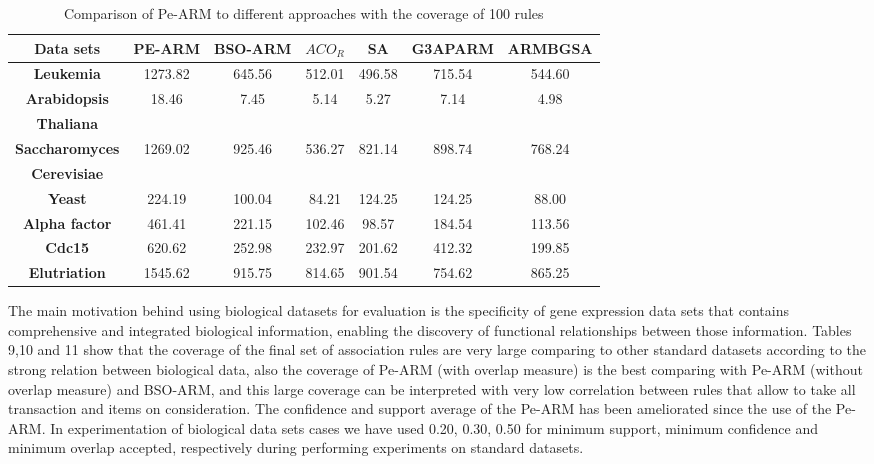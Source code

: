 \documentclass[preprint,12pt]{elsarticle}
\begin{document}
\begin{table}
\small
\centering
\caption{Comparison of Pe-ARM to  different approaches with the coverage of 100 rules}
\begin{tabular}{c c c c c c c}
\toprule
\textbf{Data sets} & PE-ARM& BSO-ARM & $ACO_{R}$ & SA & G3APARM & ARMBGSA \\
\midrule
\textbf{Leukemia}                 &  1273.82  & 645.56 & 512.01 & 496.58 & 715.54 & 544.60 \\\hline
\textbf{Arabidopsis }     &  \multirow{2}{*}{18.46 }     & \multirow{2}{*}{7.45} & \multirow{2}{*}{5.14  } & \multirow{2}{*}{5.27} & \multirow{2}{*}{7.14 }  & \multirow{2}{*}{4.98}  \\
\textbf{Thaliana} &   & &	 &  &  & \\\hline
\textbf{Saccharomyces } &  \multirow{2}{*}{1269.02}  & \multirow{2}{*}{925.46} & \multirow{2}{*}{536.27} & \multirow{2}{*}{821.14} & \multirow{2}{*}{898.74} & \multirow{2}{*}{768.24}  \\
\textbf{Cerevisiae} &   & &	 &  &  & \\\hline

\textbf{Yeast}                    &  224.19    & 100.04& 84.21  & 124.25 & 124.25 & 88.00 \\\hline
\textbf{Alpha factor}             &  461.41   & 221.15 & 102.46 & 98.57 & 184.54 & 113.56\\\hline
\textbf{Cdc15}                    &  620.62    & 252.98&  232.97& 201.62 & 412.32 & 199.85 \\\hline
\textbf{Elutriation}              &  1545.62   & 915.75&  814.65& 901.54 & 754.62 & 865.25\\\hline

\bottomrule
\end{tabular}
\end{table}
The main motivation behind using biological datasets for evaluation is the 
specificity of gene expression data sets that contains comprehensive and integrated biological information, 
enabling the discovery of functional relationships between those information. Tables 9,10 and 11 show that the coverage of the final set of association rules 
are very large comparing to other standard datasets according to the strong relation between biological data, also the coverage of Pe-ARM
(with overlap measure) is the best comparing with Pe-ARM
(without overlap measure) and BSO-ARM, and this large coverage can be interpreted with very low correlation between rules that allow to 
take all transaction and items on consideration. The confidence and support average of the Pe-ARM has been ameliorated since the use of the Pe-ARM.
In experimentation of biological data sets cases we have used 0.20, 0.30, 0.50 for minimum support, minimum confidence and minimum overlap accepted, respectively during performing experiments on standard datasets.  
\end{document}
